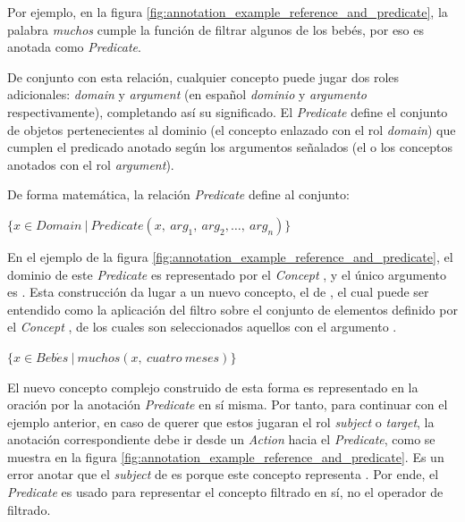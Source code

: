 Por ejemplo, en la figura \ref{fig:annotation_example_reference_and_predicate}, la palabra \textit{muchos} cumple la función de filtrar algunos de los bebés, por eso es anotada como \textit{Predicate}.

De conjunto con esta relación, cualquier concepto puede jugar dos roles adicionales: \textit{domain} y \textit{argument} (en español \textit{dominio} y \textit{argumento} respectivamente), completando así su significado. El \textit{Predicate} define el conjunto de objetos pertenecientes al dominio (el concepto enlazado con el rol \textit{domain}) que cumplen el predicado anotado según los argumentos señalados (el o los conceptos anotados con el rol \textit{argument}).

De forma matemática, la relación \textit{Predicate} define al conjunto:

\begin{center}
	$\{x\in Domain~|~Predicate(x,~arg_1,~arg_2,\dots,~arg_n)\}$
\end{center}

En el ejemplo de la figura \ref{fig:annotation_example_reference_and_predicate}, el dominio de este \textit{Predicate} es representado por el \textit{Concept} , y el único argumento es . Esta construcción da lugar a un nuevo concepto, el de , el cual puede ser entendido como la aplicación del filtro  sobre el conjunto de elementos definido por el \textit{Concept} , de los cuales son seleccionados aquellos con el argumento .

\begin{center}
	$\{x\in Beb\acute{e}s~|~muchos(x,~cuatro~meses)\}$
\end{center}

El nuevo concepto complejo construido de esta forma es representado
en la oración por la anotación \textit{Predicate} en sí misma. Por tanto, para continuar con el ejemplo anterior, en caso de querer que estos  jugaran el rol \textit{subject} o \textit{target}, la anotación correspondiente debe ir desde un \textit{Action} hacia el \textit{Predicate}, como se muestra en la figura \ref{fig:annotation_example_reference_and_predicate}. Es un error anotar que el \textit{subject} de  es  porque este concepto representa . Por ende, el \textit{Predicate} es usado para representar el concepto filtrado en sí, no el operador de filtrado.


